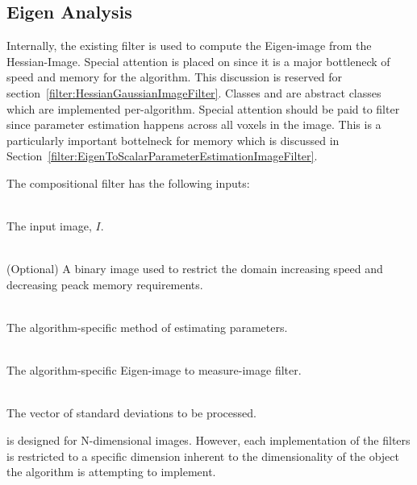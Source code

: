 \documentclass{InsightArticle}
\begin{document}
\subsection{Eigen Analysis}
\label{design:eigenanalysis}
Internally, the existing filter  is used to compute the Eigen-image from the Hessian-Image.
Special attention is placed on  since it is a major bottleneck of speed and memory for the algorithm.
This discussion is reserved for section~\ref{filter:HessianGaussianImageFilter}.
Classes  and  are abstract classes which are implemented per-algorithm.
Special attention should be paid to filter  since parameter estimation happens across all voxels in the image.
This is a particularly important bottelneck for memory which is discussed in Section~\ref{filter:EigenToScalarParameterEstimationImageFilter}.

The compositional filter  has the following inputs:
\begin{description}[style=multiline,labelindent=1cm,leftmargin=5cm]
  \item[Image] \hfill \\ The input image, $I$.
  \item[Mask] \hfill \\ (Optional) A binary image used to restrict the domain increasing speed and decreasing peack memory requirements.
  \item[\code{itk::EigenToScalarParameterEstimationImageFilter}] \hfill \\ The algorithm-specific method of estimating parameters.
  \item[\code{itk::EigenToScalarMeasureImageFilter}] \hfill \\ The algorithm-specific Eigen-image to measure-image filter.
  \item[$\Sigma$] \hfill \\ The vector of standard deviations to be processed.
\end{description}
 is designed for N-dimensional images.
However, each implementation of the  filters is restricted to a specific dimension inherent to the dimensionality of the object the algorithm is attempting to implement.
\end{document}
